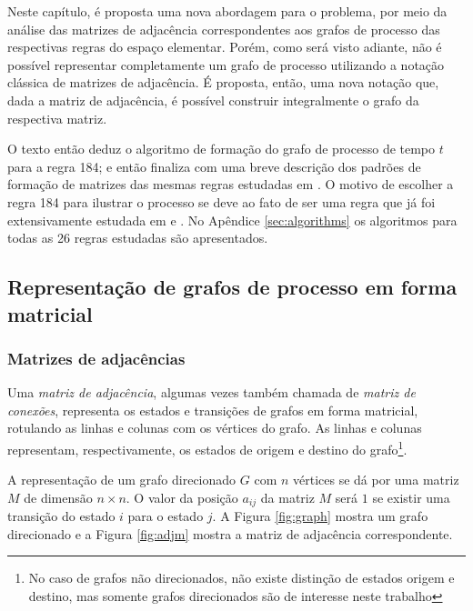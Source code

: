 \documentclass[12pt,a4paper]{article}
\begin{document}
Neste capítulo, é proposta uma nova abordagem para o problema, por meio da
análise das matrizes de adjacência correspondentes aos grafos de processo
das respectivas regras do espaço elementar. Porém, como será visto adiante,
não é possível representar completamente um grafo de processo utilizando a
notação clássica de matrizes de adjacência. É proposta, então, uma
nova notação que, dada a matriz de adjacência, é possível construir
integralmente o grafo da respectiva matriz.

O texto então deduz o algoritmo de formação do grafo de processo
de tempo $t$ para a regra 184; e então finaliza com uma breve
descrição dos padrões de formação de matrizes das mesmas regras
estudadas em . O motivo de escolher
a regra 184 para ilustrar o processo se deve ao fato de ser
uma regra que já foi extensivamente estudada em 
e . No Apêndice \ref{sec:algorithms} os algoritmos
para todas as 26 regras estudadas são apresentados.

\subsection{Representação de grafos de processo em forma matricial}

\subsubsection{Matrizes de adjacências}

Uma \textit{matriz de adjacência}, algumas vezes também chamada de
\textit{matriz de conexões}, representa os estados e transições de grafos
em forma matricial, rotulando as linhas e colunas com os vértices do grafo.
As linhas e colunas representam, respectivamente, os estados de origem e destino
do grafo\footnote{No caso de grafos não direcionados, não existe
distinção de estados origem e destino, mas somente grafos direcionados são
de interesse neste trabalho}.

A representação de um grafo direcionado $G$ com $n$ vértices se dá por uma
matriz $M$ de dimensão $n \times n$. O valor da posição $a_{ij}$ da matriz
$M$ será $1$ se existir uma transição do estado $i$ para o estado $j$.
A Figura \ref{fig:graph} mostra um grafo direcionado e a Figura \ref{fig:adjm}
mostra a matriz de adjacência correspondente.
\end{document}
